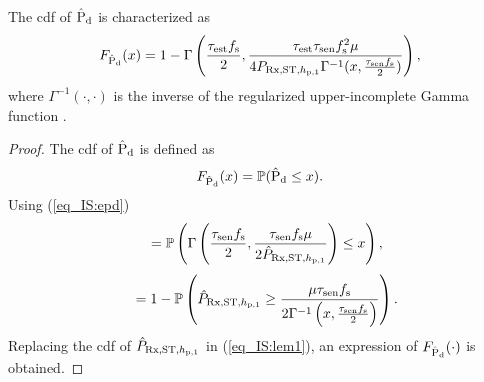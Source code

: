 \begin{lemma} \label{lm_IS:lem1}
\normalfont
The cdf of $\hat{\text{P}}_{\text{d}}$ is characterized as
\begin{align}
\fpd(x) = 1 - \Gamma \left(\frac{\test \fsam}{2}, \frac{\test \tsen \fsam^2 \mu}{4 \prcvdstpt \Gamma^{-1}(x, \frac{\tsen \fsam}{2}) } \right), 
\label{eq_IS:fpd}
\end{align}
where $\Gamma^{-1}(\cdot, \cdot)$ is the inverse of the regularized upper-incomplete Gamma function \cite{grad}.
\end{lemma}
\begin{proof}
The cdf of $\hat{\text{P}}_{\text{d}}$ is defined as
\begin{align}
F_{\hat{\text{P}}_{\text{d}}}(x) = \mathbb P(\hat{\text{P}}_{\text{d}} \le x).
\end{align}
Using (\ref{eq_IS:epd})
\begin{align}
\quad =  \mathbb P \left( \Gamma \left( \frac{\tau_{\text{sen}} f_{\text{s}}}{2}, \frac{\tau_{\text{sen}} f_{\text{s}} \mu}{2 \hat{P}_{\text{Rx,ST,$h_{\text{p,1}}$}}} \right) \le x \right), 
\end{align}
\begin{align}
\quad =  1- \p \left( \eprcvdstpt \ge \frac{\mu \tsen \fsam}{2 {\Gamma}^{-1}\left( x, \frac{\tsen \fsam}{2} \right) } \right). \label{eq_IS:lem1} 
\end{align}
Replacing the cdf of $\hat{P}_{\text{Rx,ST,$h_{\text{p,1}}$}}$ in (\ref{eq_IS:lem1}), an expression of $F_{\hat{\text{P}}_{\text{d}}}(\cdot)$ is obtained.
\end{proof}
